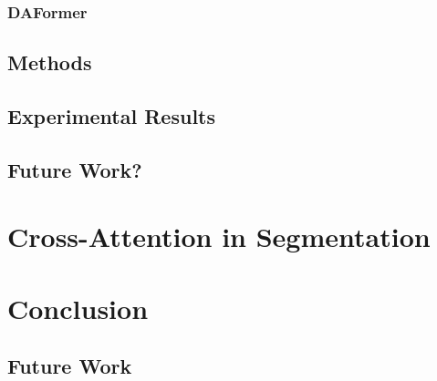 \documentclass[a4paper,12pt]{report}
\begin{document}
    \subsection*{DAFormer}

\section{Methods}

\section{Experimental Results}

\section{Future Work?}

\chapter{Cross-Attention in Segmentation}


\FloatBarrier


\chapter{Conclusion}
    \section{Future Work}


{}

\end{document}
